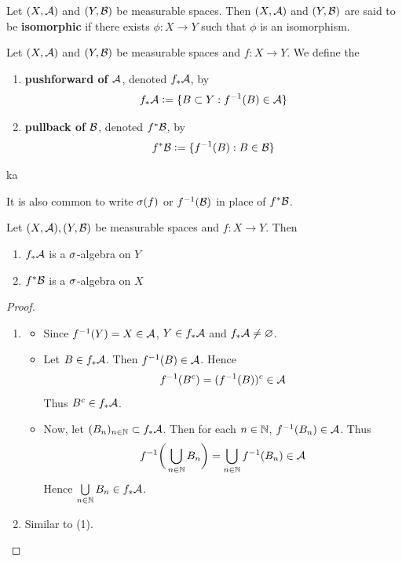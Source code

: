 \documentclass{book}
\begin{document}
	\begin{defn} 
		Let $(X, \mathcal{A})$ and $(Y, \mathcal{B})$ be measurable spaces. Then $(X, \mathcal{A})$ and $(Y, \mathcal{B})$ are said to be \textbf{isomorphic} if there exists $\phi:X \rightarrow Y$ such that $\phi$ is an isomorphism.
	\end{defn}
	
	\begin{defn} 
		Let $(X, \mathcal{A})$ and $(Y,\mathcal{B})$ be measurable spaces and $f: X \rightarrow Y$. We define the 
		\begin{enumerate}
			\item \textbf{pushforward of $\mathcal{A}$}, denoted $f_*\mathcal{A}$, by 
			$$f_*\mathcal{A} \vcentcolon= \{B \subset Y: f^{-1}(B) \in \mathcal{A}\}$$ 
			\item  \textbf{pullback of $\mathcal{B}$}, denoted $f^*\mathcal{B}$, by  
			$$f^*\mathcal{B} \vcentcolon= \{f^{-1}(B):  B \in \mathcal{B} \}$$
		\end{enumerate}
ka	\end{defn}
	
	\begin{note}
		It is also common to write $\sigma(f)$ or $f^{-1}(\mathcal{B})$ in place of $f^*\mathcal{B}$.
	\end{note}	
	
	\begin{ex}  
		Let $(X,\mathcal{A}), (Y,\mathcal{B})$ be measurable spaces and $f: X \rightarrow Y$. Then 
		\begin{enumerate}
			\item $f_*\mathcal{A}$ is a $\sigma$-algebra on $Y$
			\item $f^*\mathcal{B}$ is a $\sigma$-algebra on $X$
		\end{enumerate}
	\end{ex}
	
	\begin{proof}\
		\begin{enumerate}
			\item 
			\begin{itemize}
				\item Since $f^{-1}(Y) = X \in \mathcal{A}$, $Y \in f_*\mathcal{A}$ and $f_*\mathcal{A} \neq \varnothing$. 
				\item Let $B \in f_*\mathcal{A}$. Then $f^{-1}(B) \in \mathcal{A}$. Hence $$f^{-1}(B^c) = (f^{-1}(B))^c \in \mathcal{A}$$ Thus $B^c \in f_*\mathcal{A}$. 
				\item Now, let $(B_n)_{n \in \mathbb{N}} \subset f_*\mathcal{A}$. Then for each $n \in \mathbb{N}$, $f^{-1}(B_n) \in \mathcal{A}$. Thus $$f^{-1}\bigg(\bigcup_{n \in \mathbb{N}} B_n \bigg) = \bigcup_{n \in \mathbb{N}} f^{-1}(B_n) \in \mathcal{A}$$ Hence $\bigcup\limits_{n \in \mathbb{N}} B_n \in f_*\mathcal{A}$.
			\end{itemize}
			\item Similar to (1).
		\end{enumerate}
	\end{proof}
\end{document}
